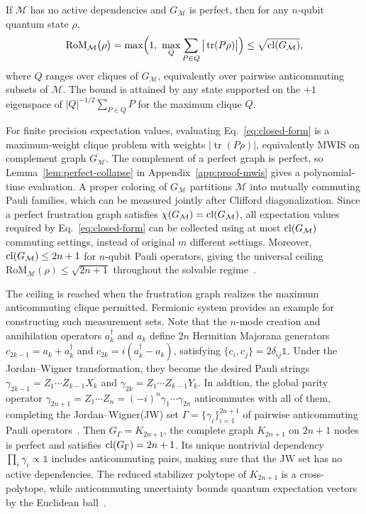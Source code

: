 \documentclass[10pt,aps,pra,twocolumn,floatfix,nofootinbib,superscriptaddress,longbibliography]{revtex4-2}
\newcommand{\Mcal}{\mathcal M}
\newcommand{\RoM}{\mathrm{RoM}}
\renewcommand{\tr}{\operatorname{tr}}
\begin{document}
	\begin{theorem}
		\label{thm:solvable}
		If $\Mcal$ has no active dependencies and $G_\Mcal$ is perfect, then for any $n$-qubit quantum state $\rho$,
		{\small
			\begin{equation}\label{eq:closed-form}
				\RoM_\Mcal\big(\rho\big)
				=
				\max\!\Big(1,\ \max_{Q} \sum_{P\in Q}\big|\tr(P\rho)\big| \Big)
				\le\sqrt{\clnum(G_\Mcal)},
			\end{equation}
		}
		where $Q$ ranges over cliques of $G_\Mcal$, equivalently over pairwise anticommuting subsets of $\Mcal$.
		The bound is attained by any state supported on the $+1$ eigenspace of $|Q|^{-1/2}\sum_{P\in Q}P$ for the maximum clique $Q$.
	\end{theorem}
	For finite precision expectation values, evaluating Eq.~\eqref{eq:closed-form} is a maximum-weight clique problem with weights $|\tr(P\rho)|$, equivalently MWIS on complement graph $\overline{G_\Mcal}$. The complement of a perfect graph is perfect, so Lemma~\ref{lem:perfect-collapse} in Appendix~\ref{app:proof-mwis} gives a polynomial-time evaluation.
	A proper coloring of $G_\Mcal$ partitions $\Mcal$ into mutually commuting Pauli families, which can be measured jointly after Clifford diagonalization. 
	Since a perfect frustration graph satisfies $\chi(G_\Mcal)=\clnum(G_\Mcal)$, all expectation values required by Eq.~\eqref{eq:closed-form} can be collected using at most $\clnum(G_\Mcal)$ commuting settings, instead of original $m$ different settings. 
	Moreover, $\clnum(G_\Mcal)\le2n+1$ for $n$-qubit Pauli operators, giving the universal ceiling $\RoM_\Mcal(\rho)\le\sqrt{2n+1}$ throughout the solvable regime~\cite{sarkar2021sets}. 
	
	The ceiling is reached when the frustration graph realizes the maximum anticommuting clique permitted.
	Fermionic system provides an example for constructing such measurement sets.  Note that the $n$-mode creation and annihilation operators $a_k^\dagger$ and $a_k$ define $2n$ Hermitian Majorana generators $c_{2k-1}=a_k+a_k^\dagger$ and $c_{2k}=i(a_k^\dagger-a_k)$, satisfying $\{c_i,c_j\}=2\delta_{ij} \mathbb{1}$.
	Under the Jordan--Wigner transformation, they become the desired Pauli strings $\gamma_{2k-1}=Z_1\cdots Z_{k-1}X_k$ and $\gamma_{2k}=Z_1\cdots Z_{k-1}Y_k$.
	In addtion, the global parity operator $\gamma_{2n+1}=Z_1\cdots Z_n=(-i)^n\gamma_1\cdots\gamma_{2n}$ anticommutes with all of them, completing the Jordan--Wigner(JW) set $\Gamma=\{\gamma_i\}_{i=1}^{2n+1}$ of pairwise anticommuting Pauli operators~\cite{brauer1935spinors,ipek2026phasespace}.
	Then $G_\Gamma=K_{2n+1}$, the complete graph $K_{2n+1}$ on $2n+1$ nodes is perfect and satisfies $\operatorname{cl}(G_\Gamma) = 2n+1$. 
	Its unique nontrivial dependency $\prod_i\gamma_i\propto\mathbb{1}$ includes anticommuting pairs, making sure that the JW set has no active dependencies. 
	The reduced stabilizer polytope of $K_{2n+1}$ is a cross-polytope, while anticommuting uncertainty bounds quantum expectation vectors by the Euclidean ball~\cite{cabello2014graph,xu2024bounding,xu2025simultaneous}.
	
\end{document}
